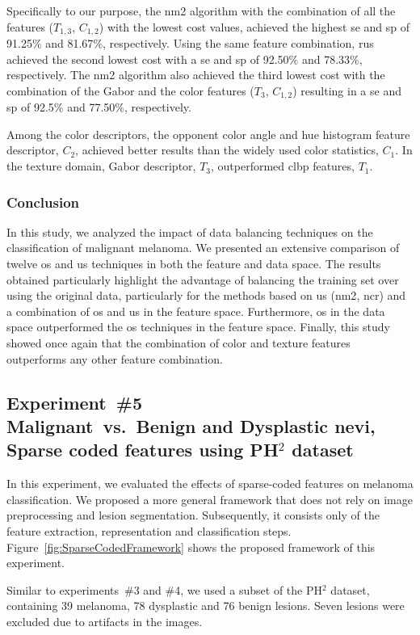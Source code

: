 Specifically to our purpose, the \ac{nm2} algorithm with the combination of all the features ($T_{1,3}$, $C_{1,2}$) with the lowest cost values, achieved the highest \ac{se} and \ac{sp} of 91.25$\%$ and 81.67$\%$, respectively. 
Using the same feature combination, \ac{rus} achieved the second lowest cost with a \ac{se} and \ac{sp} of 92.50$\%$ and 78.33$\%$, respectively. 
The \ac{nm2} algorithm also achieved the third lowest cost with the combination of the Gabor and the color features ($T_{3}$, $C_{1,2}$) resulting in a \ac{se} and \ac{sp} of 92.5$\%$ and 77.50$\%$, respectively.  

%
Among the color descriptors, the opponent color angle and hue histogram feature descriptor, $C_{2}$, achieved better results than the widely used color statistics, $C_{1}$. 
In the texture domain, Gabor descriptor, $T_{3}$, outperformed \ac{clbp} features, $T_{1}$.

\subsubsection{Conclusion}
In this study, we analyzed the impact of data balancing techniques on the classification of malignant melanoma. 
We presented an extensive comparison of twelve \ac{os} and \ac{us} techniques in both the feature and data space. 
The results obtained particularly highlight the advantage of balancing the training set over using the original data, particularly for the methods based on \ac{us} (\ac{nm2}, \ac{ncr}) and a combination of \ac{os} and \ac{us} in the feature space.
Furthermore, \ac{os} in the data space outperformed the \ac{os} techniques in the feature space.
Finally, this study showed once again that the combination of color and texture features outperforms any other feature combination. 


\subsection{Experiment~\#5\\
\small{Malignant~vs.~Benign and Dysplastic nevi, Sparse coded features using PH$^{2}$ dataset}}
In this experiment, we evaluated the effects of sparse-coded features on melanoma classification.
We proposed a more general framework that does not rely on image preprocessing and lesion segmentation.
Subsequently, it consists only of the feature extraction, representation and classification steps.
Figure~\ref{fig:SparseCodedFramework} shows the proposed framework of this experiment.

Similar to experiments~\#3 and \#4, we used a subset of the PH$^{2}$ dataset, containing 39 melanoma, 78 dysplastic and 76 benign lesions.
Seven lesions were excluded due to artifacts in the images.

